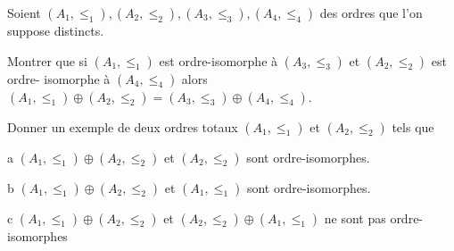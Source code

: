 \documentclass[french]{report}
\begin{document}
\begin{exo}
    Soient \(\left(A_1,\leq_1\right),\left(A_2,\leq_2\right),\left(A_3,\leq_3\right),
    \left(A_4,\leq_4\right)\) des ordres que l'on suppose distincts.
    \begin{q}{1}
        Montrer que si \(\left(A_1,\leq_1\right)\) est ordre-isomorphe à
        \(\left(A_3,\leq_3\right)\) et \(\left(A_2,\leq_2\right)\) est ordre-
        isomorphe à \(\left(A_4,\leq_4\right)\) alors \(\left(A_1,\leq_1\right)\oplus
        \left(A_2,\leq_2\right)=\left(A_3,\leq_3\right)\oplus\left(A_4,\leq_4\right)\).
    \end{q}
    \begin{q}{2}
        Donner un exemple de deux ordres totaux \(\left(A_1,\leq_1\right)\)
        et \(\left(A_2,\leq_2\right)\) tels que
        \begin{q}{a}
            \(\left(A_1,\leq_1\right)\oplus\left(A_2,\leq_2\right)\) et
            \(\left(A_2,\leq_2\right)\) sont ordre-isomorphes.
        \end{q}
        \begin{q}{b}
            \(\left(A_1,\leq_1\right)\oplus\left(A_2,\leq_2\right)\) et
            \(\left(A_1,\leq_1\right)\) sont ordre-isomorphes.
        \end{q}
        \begin{q}{c}
            \(\left(A_1,\leq_1\right)\oplus\left(A_2,\leq_2\right)\) et
            \(\left(A_2,\leq_2\right)\oplus\left(A_1,\leq_1\right)\) ne sont pas
            ordre-isomorphes
        \end{q}
    \end{q}
\end{exo}
\end{document}
